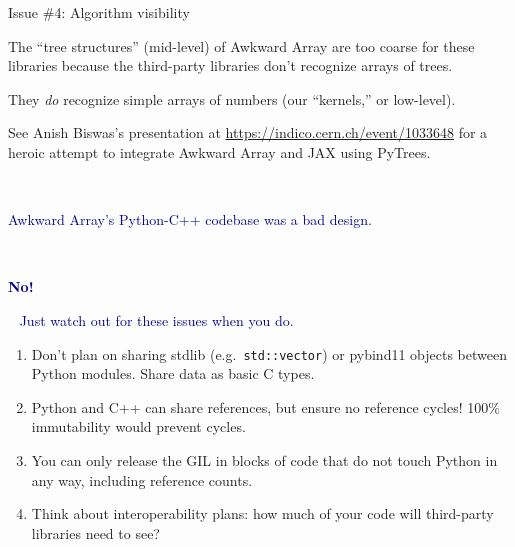 \documentclass[aspectratio=169]{beamer}
\begin{document}
\begin{frame}{Issue \#4: Algorithm visibility}
\large
\vspace{0.5 cm}

The ``tree structures'' (mid-level) of Awkward Array are too coarse for these libraries because the third-party libraries don't recognize arrays of trees.

\vspace{0.5 cm}
They {\it do} recognize simple arrays of numbers (our ``kernels,'' or low-level).

\vspace{0.5 cm}
See Anish Biswas's presentation at \textcolor{blue}{\href{https://indico.cern.ch/event/1033648}{https://indico.cern.ch/event/1033648}} for a heroic attempt to integrate Awkward Array and JAX using PyTrees.

\vspace{0.5 cm}
\end{frame}

\begin{frame}{\mbox{ }}
\LARGE
\begin{center}
\textcolor{darkblue}{Awkward Array's Python-C++ codebase was a bad design.}

\vspace{1 cm}
\textcolor{darkblue}{}
\end{center}
\end{frame}

\begin{frame}{\mbox{ }}
\Huge
\begin{center}
\textcolor{darkblue}{\bf No!}
\end{center}
\end{frame}

\begin{frame}{\mbox{ }}
\vspace{0.25 cm}
\LARGE
\textcolor{darkblue}{Just watch out for these issues when you do.}

\vspace{0.25 cm}
\Large
\begin{enumerate}\setlength{\itemsep}{0.25 cm}
\item Don't plan on sharing stdlib (e.g.\ \texttt{std::vector}) or pybind11 objects between Python modules. Share data as basic C types.

\item Python and C++ can share references, but ensure no reference cycles! 100\% immutability would prevent cycles.

\item You can only release the GIL in blocks of code that do not touch Python in any way, including reference counts.

\item Think about interoperability plans: how much of your code will third-party libraries need to see?
\end{enumerate}
\end{frame}
\end{document}
